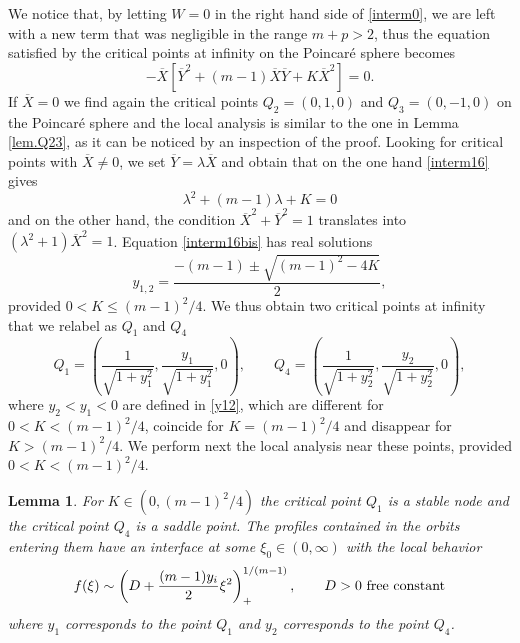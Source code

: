 \documentclass[a4paper,11pt]{article}
\newtheorem{lemma}[theorem]{Lemma}
\numberwithin{equation}{section}
\begin{document}
We notice that, by letting $W=0$ in the right hand side of \eqref{interm0}, we are left with a new term that was negligible in the range $m+p>2$, thus the equation satisfied by the critical points at infinity on the Poincar\'e sphere becomes
\begin{equation}\label{interm16}
-\overline{X}\left[\overline{Y}^2+(m-1)\overline{X}\overline{Y}+K\overline{X}^2\right]=0.
\end{equation}
If $\overline{X}=0$ we find again the critical points $Q_2=(0,1,0)$ and $Q_3=(0,-1,0)$ on the Poincar\'e sphere and the local analysis is similar to the one in Lemma \ref{lem.Q23}, as it can be noticed by an inspection of the proof. Looking for critical points with $\overline{X}\neq0$, we set $\overline{Y}=\lambda\overline{X}$ and obtain that on the one hand \eqref{interm16} gives
\begin{equation}\label{interm16bis}
\lambda^2+(m-1)\lambda+K=0
\end{equation}
and on the other hand, the condition $\overline{X}^2+\overline{Y}^2=1$ translates into $(\lambda^2+1)\overline{X}^2=1$. Equation \eqref{interm16bis} has real solutions
\begin{equation}\label{y12}
y_{1,2}=\frac{-(m-1)\pm\sqrt{(m-1)^2-4K}}{2},
\end{equation}
provided $0<K\leq(m-1)^2/4$. We thus obtain two critical points at infinity that we relabel as $Q_1$ and $Q_4$
$$
Q_1=\left(\frac{1}{\sqrt{1+y_1^2}},\frac{y_1}{\sqrt{1+y_1^2}},0\right), \qquad Q_4=\left(\frac{1}{\sqrt{1+y_2^2}},\frac{y_2}{\sqrt{1+y_2^2}},0\right),
$$
where $y_2<y_1<0$ are defined in \eqref{y12}, which are different for $0<K<(m-1)^2/4$, coincide for $K=(m-1)^2/4$ and disappear for $K>(m-1)^2/4$. We perform next the local analysis near these points, provided $0<K<(m-1)^2/4$.
\begin{lemma}\label{lem.Q14}
For $K\in(0,(m-1)^2/4)$ the critical point $Q_1$ is a stable node and the critical point $Q_4$ is a saddle point. The profiles contained in the orbits entering them have an interface at some $\xi_0\in(0,\infty)$ with the local behavior
\begin{equation}\label{beh.Q14}
f(\xi)\sim\left(D+\frac{(m-1)y_i}{2}\xi^2\right)_{+}^{1/(m-1)}, \qquad D>0 \ {\rm free \ constant}
\end{equation}
where $y_1$ corresponds to the point $Q_1$ and $y_2$ corresponds to the point $Q_4$.
\end{lemma}
\end{document}
